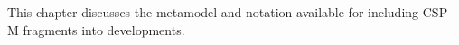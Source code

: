 
This chapter discusses the metamodel and notation available for including
CSP-M fragments into \langname{} developments.

